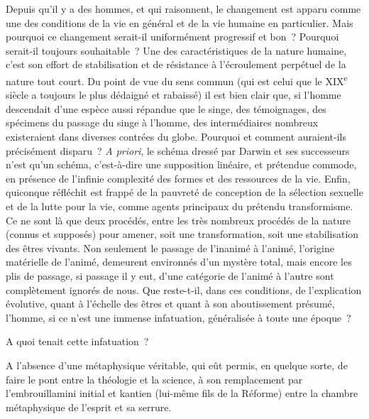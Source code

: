 \documentclass[french,twoside]{book} %
\begin{document}
Depuis qu’il y a des hommes, et qui raisonnent, le changement est apparu comme une des conditions de la vie en général et de la vie humaine en particulier. Mais pourquoi ce changement serait-il uniformément progressif et bon ? Pourquoi serait-il toujours souhaitable ? Une des caractéristiques de la nature humaine, c’est son effort de stabilisation et de résistance à l’écroulement perpétuel de la nature tout court. Du point de vue du sens commun (qui est celui que le XIX\textsuperscript{e} siècle a toujours le plus dédaigné et rabaissé) il est bien clair que, si l’homme descendait d’une espèce aussi répandue que le singe, des témoignages, des spécimens du passage du singe à l’homme, des intermédiaires nombreux existeraient dans diverses contrées du globe. Pourquoi et comment auraient-ils précisément disparu ? {\itshape A priori}, le schéma dressé par Darwin et ses successeurs n’est qu’un schéma, c’est-à-dire une supposition linéaire, et prétendue commode, en présence de l’infinie complexité des formes et des ressources de la vie. Enfin, quiconque réfléchit est frappé de la pauvreté de conception de la sélection sexuelle et de la lutte pour la vie, comme agents principaux du prétendu transformisme. Ce ne sont là que deux procédés, entre les très nombreux procédés de la nature (connus et supposés) pour amener, soit une transformation, soit une stabilisation des êtres vivants. Non seulement le passage de l’inanimé à l’animé, l’origine matérielle de l’animé, demeurent environnés d’un mystère total, mais encore les plis de passage, si passage il y eut, d’une catégorie de l’animé à l’autre sont complètement ignorés de nous. Que reste-t-il, dans ces conditions, de l’explication évolutive, quant à l’échelle des êtres et quant à son aboutissement présumé, l’homme, si ce n’est une immense infatuation, généralisée à toute une époque ?\par
A quoi tenait cette infatuation ?\par
A l’absence d’une métaphysique véritable, qui eût permis, en quelque sorte, de faire le pont entre la théologie et la science, à son remplacement par l’embrouillamini initial et kantien (lui-même fils de la Réforme) entre la chambre métaphysique de l’esprit et sa serrure.\par
\end{document}
